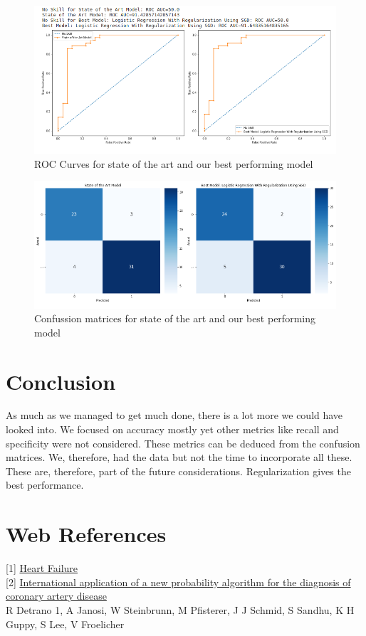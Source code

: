 \begin{figure}[H]
    \begin{center}
        \includegraphics[scale=0.6]{Images/state.png}
    \end{center}
    \caption{ROC Curves for state of the art and our best performing model}
\end{figure}

\begin{figure}[H]
    \begin{center}
        \includegraphics[scale=0.6]{Images/statess.png}
    \end{center}
    \caption{Confussion matrices for state of the art and our best performing model}
\end{figure}
\newpage
\section{Conclusion}
As much as we managed to get much done, there is a lot more we could have looked into. We focused on accuracy mostly yet other metrics like recall and specificity were not considered. These metrics can be deduced from the confusion matrices. We, therefore, had the data but not the time to incorporate all these. These are, therefore, part of the future considerations. Regularization gives the best performance.

\newpage
\section{Web References}
[1] \href{https://my.clevelandclinic.org/health/diseases/17069-heart-failure-understanding-heart-failure}{Heart Failure} \\

[2] \href{https://pubmed.ncbi.nlm.nih.gov/2756873/}{International application of a new probability algorithm for the diagnosis of coronary artery disease} \\
R Detrano 1, A Janosi, W Steinbrunn, M Pfisterer, J J Schmid, S Sandhu, K H Guppy, S Lee, V Froelicher
    
    